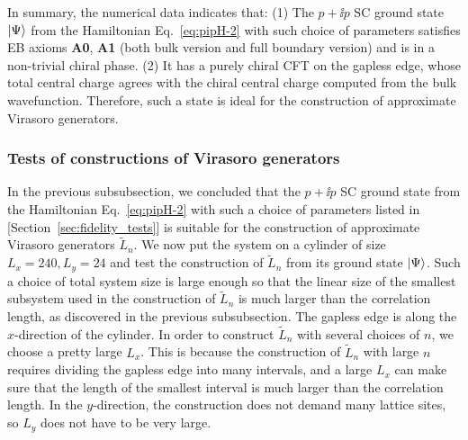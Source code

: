 \documentclass[12pt, nofootinbib]{article}
\theoremstyle{plain}
\theoremstyle{assumption}
\theoremstyle{definition}
\theoremstyle{plain}
\theoremstyle{plain}
\theoremstyle{plain}
\theoremstyle{plain}
\theoremstyle{plain}
\def\Leff{\widetilde{L}}
\begin{document}
In summary, the numerical data indicates that: (1) The $p+\ii p$ SC ground state $\left|\Psi\right\rangle$ from the Hamiltonian Eq.~\eqref{eq:pipH-2} with such choice of parameters satisfies EB axioms {\bf A0}, {\bf A1} (both bulk version and full boundary version) and is in a non-trivial chiral phase. (2) It has a purely chiral CFT on the gapless edge, whose total central charge agrees with the chiral central charge computed from the bulk wavefunction. Therefore, such a state is ideal for the construction of approximate Virasoro generators.  

\subsubsection{Tests of constructions of Virasoro generators}
\label{subsec:virasoro_tests}
In the previous subsubsection, we concluded that the $p+\ii p$ SC ground state from the Hamiltonian Eq.~\eqref{eq:pipH-2} with such a choice of parameters listed in [Section~\ref{sec:fidelity_tests}] is suitable for the construction of approximate Virasoro generators $\Leff_n$. We now put the system on a cylinder of size $L_x=240, L_y=24$ and test the construction of $\Leff_n$ from its ground state $\left|\Psi\right\rangle$. Such a choice of total system size is large enough so that the linear size of the smallest subsystem used in the construction of $\Leff_n$ is much larger than the correlation length, as discovered in the previous subsubsection. The gapless edge is along the $x$-direction of the cylinder. In order to construct $\Leff_n$ with several choices of $n$, we choose a pretty large $L_x$. This is because the construction of $\Leff_n$ with large $n$ requires dividing the gapless edge into many intervals, and a large $L_x$ can make sure that the length of the smallest interval is much larger than the correlation length. In the $y$-direction, the construction does not demand many lattice sites, so $L_y$ does not have to be very large. 
\end{document}
